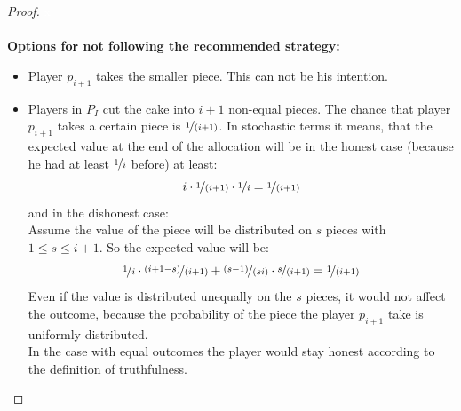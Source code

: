 \begin{proof} 
\textcolor{white}{x}\\\\
\textbf{Options for not following the recommended strategy:}
\begin{itemize}
\item Player $p_{i+1}$ takes the smaller piece. This can not be his intention.
\item Players in $P_I$ cut the cake into $i+1$ non-equal pieces. The chance that player $p_{i+1}$ takes a certain piece is $\nicefrac{1}{(i+1)}$. In stochastic terms it means, that the expected value at the end of the allocation will be in the honest case (because he had at least $\nicefrac{1}{i}$ before) at least: $$ i \cdot \nicefrac{1}{(i+1)} \cdot \nicefrac{1}{i} =\nicefrac{1}{(i+1)} $$ and in the dishonest case:\\
Assume the value of the piece will be distributed on $s$ pieces with $1 \leq s \leq i+1$. So the expected value will be: $$ \nicefrac{1}{i} \cdot \nicefrac{(i+1-s)}{(i+1)} + \nicefrac{(s-1)}{(si)}\cdot \nicefrac{s}{(i+1)} =\nicefrac{1}{(i+1)} $$ Even if the value is distributed unequally on the $s$ pieces, it would not affect the outcome, because the probability of the piece the player $p_{i+1}$ take is uniformly distributed.\\
 \newline In the case with equal outcomes the player would stay honest according to the definition of truthfulness.
\end{itemize}
\end{proof}
